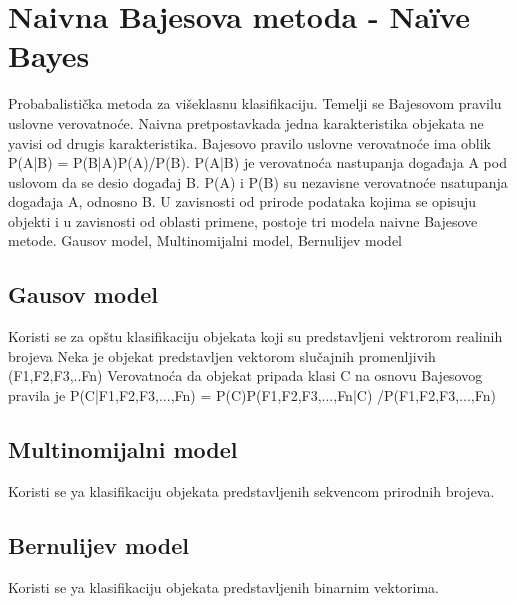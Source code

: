 \section{Naivna Bajesova metoda - Naïve Bayes}
Probabalistička metoda za višeklasnu klasifikaciju. Temelji se Bajesovom pravilu uslovne verovatnoće. Naivna pretpostavkada jedna karakteristika objekata ne yavisi od drugis karakteristika. Bajesovo pravilo uslovne verovatnoće ima oblik P(A|B) = P(B|A)P(A)/P(B). P(A|B) je verovatnoća nastupanja događaja A pod uslovom da se desio događaj B. P(A) i P(B) su nezavisne verovatnoće nsatupanja događaja A, odnosno B. U zavisnosti od prirode podataka kojima se opisuju objekti i u zavisnosti od oblasti primene, postoje tri modela naivne Bajesove metode. Gausov model, Multinomijalni model, Bernulijev model

\subsection{Gausov model}

Koristi se za opštu klasifikaciju objekata koji su predstavljeni vektrorom realinih brojeva
Neka je objekat predstavljen vektorom slučajnih promenljivih (F1,F2,F3,..Fn)
Verovatnoća da objekat pripada klasi C na osnovu Bajesovog pravila je P(C|F1,F2,F3,...,Fn) = P(C)P(F1,F2,F3,...,Fn|C) /P(F1,F2,F3,...,Fn)

\subsection{Multinomijalni model}

Koristi se ya klasifikaciju objekata predstavljenih sekvencom prirodnih brojeva. \\
\subsection{Bernulijev model}

Koristi se ya klasifikaciju objekata predstavljenih binarnim vektorima. \\
